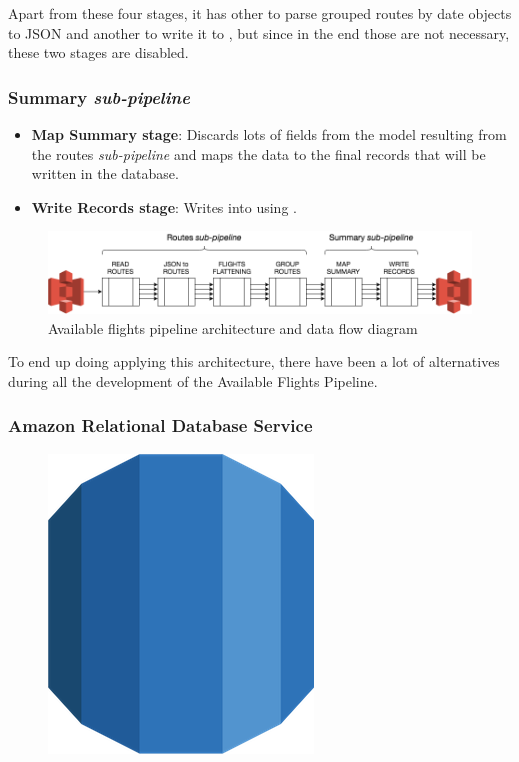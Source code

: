 Apart from these four stages, it has other to parse grouped routes by date objects to JSON\cite{json} and another to write it to , but since in the end those are not necessary, these two stages are disabled.

\subsubsection*{Summary \textit{sub-pipeline}}


\begin{itemize}
    \item \textbf{Map Summary stage}: Discards lots of fields from the model resulting from the routes \textit{sub-pipeline} and maps the data to the final records that will be written in the database.
    \item \textbf{Write Records stage}: Writes into  using .
\end{itemize}

\begin{figure}[H]
\centering
\includegraphics[scale=0.45]{diagrams/available-flights-pipeline-architecture.png}
\caption{Available flights pipeline architecture and data flow diagram}
\end{figure}

To end up doing applying this architecture, there have been a lot of alternatives during all the development of the Available Flights Pipeline.

\subsubsection*{Amazon Relational Database Service} \label{rds}

\begin{figure}[H]
\includegraphics[scale=0.1]{resources/rds-logo.png}
\end{figure}

